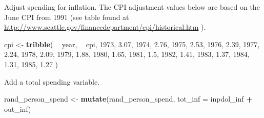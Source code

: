 \documentclass[]{book}
\newenvironment{Shaded}{\begin{snugshade}}{\end{snugshade}}
\newcommand{\KeywordTok}[1]{\textcolor[rgb]{0.13,0.29,0.53}{\textbf{#1}}}
\newcommand{\DataTypeTok}[1]{\textcolor[rgb]{0.13,0.29,0.53}{#1}}
\newcommand{\DecValTok}[1]{\textcolor[rgb]{0.00,0.00,0.81}{#1}}
\newcommand{\FloatTok}[1]{\textcolor[rgb]{0.00,0.00,0.81}{#1}}
\newcommand{\StringTok}[1]{\textcolor[rgb]{0.31,0.60,0.02}{#1}}
\newcommand{\OperatorTok}[1]{\textcolor[rgb]{0.81,0.36,0.00}{\textbf{#1}}}
\newcommand{\NormalTok}[1]{#1}
\theoremstyle{definition}
\theoremstyle{definition}
\theoremstyle{definition}
\theoremstyle{remark}
\begin{document}
Adjust spending for inflation. The CPI adjustment values below are based
on the June CPI from 1991 (see table found at
\url{http://www.seattle.gov/financedepartment/cpi/historical.htm} ).

\begin{Shaded}
\begin{Highlighting}[]
\NormalTok{cpi <-}\StringTok{ }\KeywordTok{tribble}\NormalTok{(}
  \OperatorTok{~}\StringTok{ }\NormalTok{year, }\OperatorTok{~}\StringTok{ }\NormalTok{cpi,}
  \DecValTok{1973}\NormalTok{, }\FloatTok{3.07}\NormalTok{,}
  \DecValTok{1974}\NormalTok{, }\FloatTok{2.76}\NormalTok{,}
  \DecValTok{1975}\NormalTok{, }\FloatTok{2.53}\NormalTok{,}
  \DecValTok{1976}\NormalTok{, }\FloatTok{2.39}\NormalTok{,}
  \DecValTok{1977}\NormalTok{, }\FloatTok{2.24}\NormalTok{,}
  \DecValTok{1978}\NormalTok{, }\FloatTok{2.09}\NormalTok{,}
  \DecValTok{1979}\NormalTok{, }\FloatTok{1.88}\NormalTok{,}
  \DecValTok{1980}\NormalTok{, }\FloatTok{1.65}\NormalTok{,}
  \DecValTok{1981}\NormalTok{, }\FloatTok{1.5}\NormalTok{,}
  \DecValTok{1982}\NormalTok{, }\FloatTok{1.41}\NormalTok{,}
  \DecValTok{1983}\NormalTok{, }\FloatTok{1.37}\NormalTok{,}
  \DecValTok{1984}\NormalTok{, }\FloatTok{1.31}\NormalTok{,}
  \DecValTok{1985}\NormalTok{, }\FloatTok{1.27}
\NormalTok{)}
\end{Highlighting}
\end{Shaded}

\begin{Shaded}
\end{Shaded}

Add a total spending variable.

\begin{Shaded}
\begin{Highlighting}[]
\NormalTok{rand_person_spend <-}\StringTok{ }\KeywordTok{mutate}\NormalTok{(rand_person_spend,}
                       \DataTypeTok{tot_inf =}\NormalTok{ inpdol_inf }\OperatorTok{+}\StringTok{ }\NormalTok{out_inf)}
\end{Highlighting}
\end{Shaded}
\end{document}
